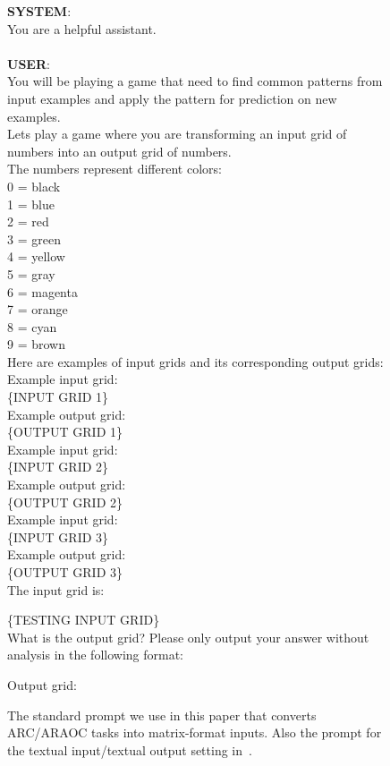 \begin{figure*}
  \begin{tcolorbox}
  \textbf{SYSTEM}:\\
  You are a helpful assistant.\\\\
  \textbf{USER}: \\
        You will be playing a game that need to find common patterns from input examples and apply the pattern for prediction on new examples.\\
Lets play a game where you are transforming an input grid of numbers into an output grid of numbers.\\

The numbers represent different colors:\\
0 = black\\
1 = blue\\
2 = red\\
3 = green\\
4 = yellow\\
5 = gray\\
6 = magenta\\
7 = orange\\
8 = cyan\\
9 = brown\\

Here are examples of input grids and its corresponding output grids:\\
Example input grid:\\
\{INPUT GRID 1\} \\
Example output grid:\\
\{OUTPUT GRID 1\} \\

Example input grid:\\
\{INPUT GRID 2\} \\
Example output grid:\\
\{OUTPUT GRID 2\} \\

Example input grid:\\
\{INPUT GRID 3\} \\
Example output grid:\\
\{OUTPUT GRID 3\} \\

The input grid is:

\{TESTING INPUT GRID\} \\

What is the output grid? Please only output your answer without analysis in the following format:

Output grid:

    \end{tcolorbox}
    \caption{The standard prompt we use in this paper that converts ARC/ARAOC tasks into matrix-format inputs. Also the prompt for the textual input/textual output setting in~.}
    \label{fig:original prompt}
\end{figure*}

